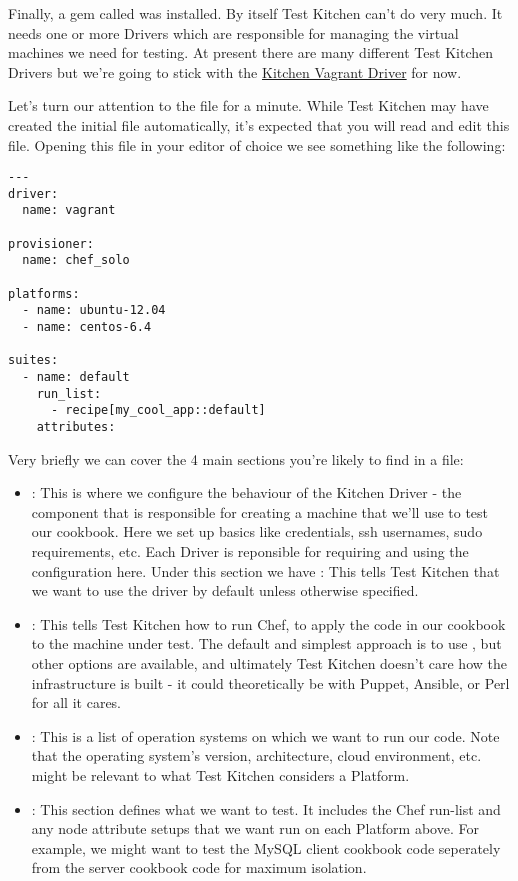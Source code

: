 Finally, a gem called  was installed. By itself Test Kitchen can't do very much. It needs one or more Drivers which are responsible for managing the virtual machines we need for testing. At present there are many different Test Kitchen Drivers but we're going to stick with the \href{https://github.com/opscode/kitchen-vagrant}{Kitchen Vagrant Driver} for now.

Let's turn our attention to the  file for a minute. While Test Kitchen may have created the initial file automatically, it's expected that you will read and edit this file. Opening this file in your editor of choice we see something like the following:

\begin{lstlisting}[label=lst:testing-test-kitchen4]
---
driver:
  name: vagrant

provisioner:
  name: chef_solo

platforms:
  - name: ubuntu-12.04
  - name: centos-6.4

suites:
  - name: default
    run_list:
      - recipe[my_cool_app::default]
    attributes:
\end{lstlisting}

Very briefly we can cover the 4 main sections you're likely to find in a  file:

\begin{itemize}
  \item {}: This is where we configure the behaviour of the Kitchen Driver - the component that is responsible for creating a machine that we'll use to test our cookbook. Here we set up basics like credentials, ssh usernames, sudo requirements, etc. Each Driver is reponsible for requiring and using the configuration here. Under this section we have : This tells Test Kitchen that we want to use the  driver by default unless otherwise specified.
  \item {}: This tells Test Kitchen how to run Chef, to apply the code in our cookbook to the machine under test. The default and simplest approach is to use , but other options are available, and ultimately Test Kitchen doesn't care how the infrastructure is built - it could theoretically be with Puppet, Ansible, or Perl for all it cares.
  \item {}: This is a list of operation systems on which we want to run our code. Note that the operating system's version, architecture, cloud environment, etc. might be relevant to what Test Kitchen considers a Platform.
  \item {}: This section defines what we want to test. It includes the Chef run-list and any node attribute setups that we want run on each Platform above. For example, we might want to test the MySQL client cookbook code seperately from the server cookbook code for maximum isolation.
\end{itemize}

